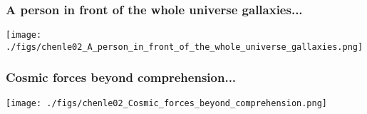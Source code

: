 \documentclass[9pt,xcolor=dvipsnames,table]{beamer}
\begin{document}
\begin{frame}[fragile,t] %
  \frametitle{A person in front of the whole universe gallaxies...}
  \begin{center}
    \texttt{[image: ./figs/chenle02\_A\_person\_in\_front\_of\_the\_whole\_universe\_gallaxies.png]}
  \end{center}
\end{frame}
\begin{frame}[fragile,t] %
  \frametitle{Cosmic forces beyond comprehension...}
  \begin{center}
    \texttt{[image: ./figs/chenle02\_Cosmic\_forces\_beyond\_comprehension.png]}
  \end{center}
\end{frame}
\end{document}
